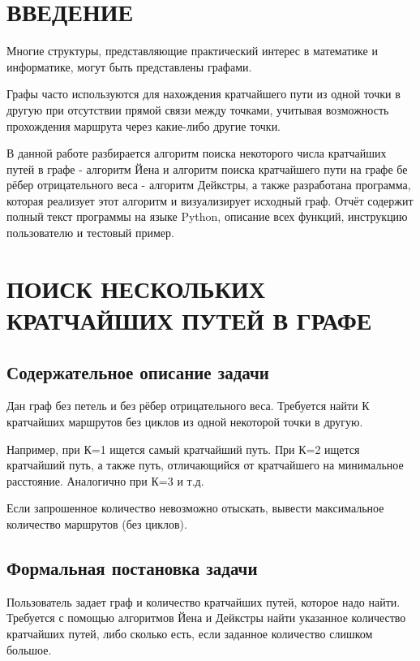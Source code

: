 

\setcounter{page}{2}
\normalfont
\tableofcontents
\clearpage
\section*{ВВЕДЕНИЕ}
Многие структуры, представляющие практический интерес в математике и информатике, могут быть представлены графами. 

Графы часто используются для нахождения кратчайшего пути из одной точки в другую при отсутствии прямой связи между точками, учитывая возможность прохождения маршрута через какие-либо другие точки.

В данной работе разбирается алгоритм поиска некоторого числа кратчайших путей в графе - алгоритм Йена и алгоритм поиска кратчайшего пути на графе бе рёбер отрицательного веса - алгоритм Дейкстры, а также разработана программа, которая реализует этот алгоритм и визуализирует исходный граф. Отчёт содержит полный текст программы на языке Python, описание всех функций, инструкцию пользователю и тестовый пример.
\clearpage
\section{ПОИСК НЕСКОЛЬКИХ КРАТЧАЙШИХ ПУТЕЙ В ГРАФЕ}
\subsection{Содержательное описание задачи}
Дан граф без петель и без рёбер отрицательного веса. Требуется найти К кратчайших маршрутов без циклов из одной некоторой точки в другую.

Например, при К=1 ищется самый кратчайший путь. При К=2 ищется кратчайший путь, а также путь, отличающийся от кратчайшего на минимальное расстояние. Аналогично при К=3 и т.д.

Если запрошенное количество невозможно отыскать, вывести максимальное количество маршрутов (без циклов).
\subsection{Формальная постановка задачи}

Пользователь задает граф и количество кратчайших путей, которое надо найти. Требуется с помощью алгоритмов Йена и Дейкстры найти указанное количество кратчайших путей, либо сколько есть, если заданное количество слишком большое.

